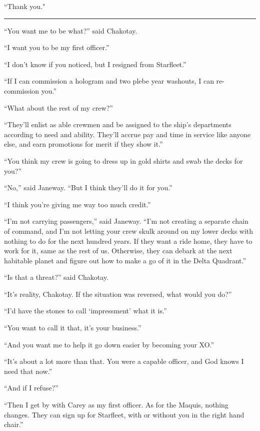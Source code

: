 \documentclass[twoside,letterpaper,12pt]{memoir}
\begin{document}
``Thank you."

\begin{center}\rule{3cm}{0.4 pt}\end{center} 

``You want me to be what?” said Chakotay. 

``I want you to be my first officer.” 

``I don’t know if you noticed, but I resigned from Starfleet.” 


``If I can commission a hologram and two plebe year washouts, I can re-commission you.” 

``What about the rest of my crew?” 

``They’ll enlist as able crewmen and be assigned to the ship’s departments according to need and ability. They’ll accrue pay and time in service like anyone else, and earn promotions for merit if they show it.” 

``You think my crew is going to dress up in gold shirts and swab the decks for you?” 

``No,” said Janeway. ``But I think they’ll do it for you.” 

``I think you’re giving me way too much credit.” 

``I’m not carrying passengers,” said Janeway. ``I’m not creating a separate chain of command, and I’m not letting your crew skulk around on my lower decks with nothing to do for the next hundred years. If they want a ride home, they have to work for it, same as the rest of us. Otherwise, they can debark at the next habitable planet and figure out how to make a go of it in the Delta Quadrant.” 

``Is that a threat?” said Chakotay. 

``It’s reality, Chakotay. If the situation was reversed, what would you do?” 

``I’d have the stones to call ‘impressment’ what it is.” 

``You want to call it that, it’s your business.” 

``And you want me to help it go down easier by becoming your XO.” 

``It’s about a lot more than that. You were a capable officer, and God knows I need that now.” 

``And if I refuse?” 

``Then I get by with Carey as my first officer. As for the Maquis, nothing changes. They can sign up for Starfleet, with or without you in the right hand chair.” 
\end{document}
